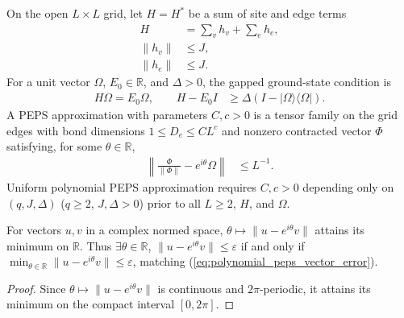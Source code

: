 \begin{definition}
    \label{def:polynomial_peps_model}
    \leanok
    On the open $L\times L$ grid, let $H=H^*$ be a sum of site and edge terms
    \begin{align}
        H       & =\sum_v h_v+\sum_e h_e,
        \label{eq:polynomial_peps_hamiltonian} \\
        \|h_v\| & \le J,
        \label{eq:polynomial_peps_site_bound}  \\
        \|h_e\| & \le J.
        \label{eq:polynomial_peps_edge_bound}
    \end{align}
    For a unit vector $\Omega$, $E_0\in\mathbb R$, and $\Delta>0$, the gapped
    ground-state condition is
    \begin{align}
        H\Omega=E_0\Omega,
        \qquad
        H-E_0I & \ge\Delta(I-|\Omega\rangle\langle\Omega|).
        \label{eq:polynomial_peps_projector_gap}
    \end{align}
    A PEPS approximation with parameters $C,c>0$ is a tensor family on the grid
    edges with bond dimensions $1\le D_e\le CL^c$ and nonzero contracted vector
    $\Phi$ satisfying, for some $\theta\in\mathbb R$,
    \begin{align}
        \left\|\frac{\Phi}{\|\Phi\|}-e^{i\theta}\Omega\right\| & \le L^{-1}.
        \label{eq:polynomial_peps_vector_error}
    \end{align}
    Uniform polynomial PEPS approximation requires $C,c>0$ depending only on
    $(q,J,\Delta)$ ($q\ge2$, $J,\Delta>0$) prior to all $L\ge2$, $H$, and
    $\Omega$.
\end{definition}

\begin{lemma}
    \label{lem:polynomial_peps_minimizing_phase}
    \leanok
    For vectors $u,v$ in a complex normed space, $\theta\mapsto\|u-e^{i\theta}v\|$
    attains its minimum on $\mathbb R$. Thus $\exists\theta\in\mathbb R$,
    $\|u-e^{i\theta}v\|\le\varepsilon$ if and only if
    $\min_{\theta\in\mathbb R}\|u-e^{i\theta}v\|\le\varepsilon$, matching
    (\ref{eq:polynomial_peps_vector_error}).
\end{lemma}
\begin{proof}
    \leanok
    Since $\theta\mapsto\|u-e^{i\theta}v\|$ is continuous and $2\pi$-periodic,
    it attains its minimum on the compact interval $[0,2\pi]$.
\end{proof}


